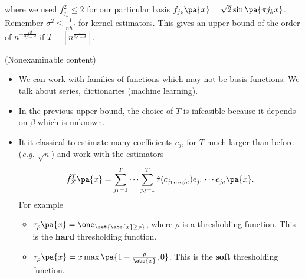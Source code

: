 where we used $f_{j_k}^2 \leq 2$ for our particular basis $f_{j_k}\pa{x} = \sqrt{2}\sin\pa{\pi j_k x}$.
Remember $\sigma^2 \leq \frac{1}{nh^d}$ for kernel estimators.
This gives an upper bound of the order of $n^{-\frac{2\beta}{2\beta +d }}$ if $T = \left\lfloor n^{\frac{1}{2\beta + d}}\right\rfloor$.
\begin{remark}(Nonexaminable content)
    \begin{itemize}
        \item We can work with families of functions which may not be basis functions. We talk about series, dictionaries (machine learning).
        \item In the previous upper bound, the choice of $T$ is infeasible because it depends on $\beta$ which is unknown. 
        \item It it classical to estimate many coefficients $c_j$, for $T$ much larger than before (\emph{e.g.} $\sqrt{n}$) and work with the estimators\begin{equation*}
            \hat f_X^T\pa{x} = \sum_{j_1=1}^T \cdots \sum_{j_d=1}^T \hat \tau(c_{j_1,...,j_d}) e_{j_1}\cdots e_{j_d}\pa{x}.
        \end{equation*}
        For example 
        \begin{itemize}
            \item $\tau_\rho \pa{x} = \one_{\set{\abs{x}\geq \rho}}$, where $\rho$ is a thresholding function. This is the \textbf{hard} thresholding function.
            \item $\tau_\rho \pa{x} = x \max \pa{1-\frac{\rho}{\abs{x}},0}$. This is the \textbf{soft} thresholding function.
            \end{itemize}
    \end{itemize}

     
\end{remark}